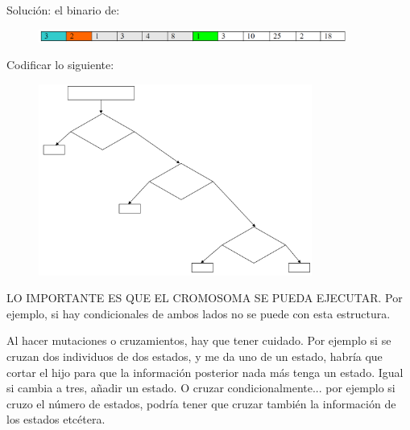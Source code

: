 Solución: el binario de:

\begin{figure}[h!]
	
	\includegraphics[width=0.9\textwidth]{images/img92.png}
	\label{figura92}
\end{figure}

\begin{ejemplo}
Codificar lo siguiente:
\end{ejemplo}


\begin{figure}[h!]
	
	\includegraphics[width=0.8\textwidth]{images/img93.png}
	\label{figura93}
\end{figure}

 



\begin{nota}
LO IMPORTANTE ES QUE EL CROMOSOMA SE PUEDA EJECUTAR. Por ejemplo, si hay
condicionales de ambos lados no se puede con esta estructura.
\end{nota}

\begin{nota}
	Al hacer mutaciones o cruzamientos, hay que tener cuidado. Por ejemplo si se cruzan dos individuos
	de dos estados, y me da uno de un estado, habría que cortar el hijo para que la información posterior nada
	más tenga un estado. Igual si cambia a tres, añadir un estado. O cruzar condicionalmente... por ejemplo si
	cruzo el número de estados, podría tener que cruzar también la información de los estados etcétera.
\end{nota}


